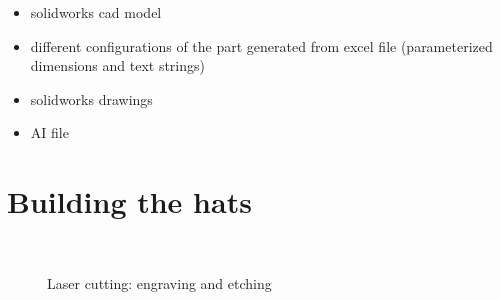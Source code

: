 \documentclass{article}
\begin{document}
\begin{itemize}
\item solidworks cad model
\item different configurations of the part generated from excel file (parameterized dimensions and text strings)
\item solidworks drawings
\item AI file
\end{itemize}

\section{Building the hats}

\begin{figure}
\centering
{}\\
\caption{Laser cutting: engraving and etching}
\label{fig:lasercut}
\end{figure}
\end{document}
